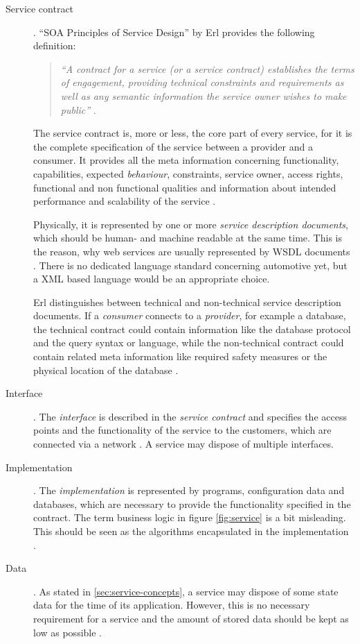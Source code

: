 \begin{description}
\item [Service contract]. 
``SOA Principles of Service Design'' by Erl provides the following definition:
\begin{quote}
\emph{``A contract for a service (or a service contract) establishes the terms of engagement, providing technical constraints and requirements as well as any semantic information the service owner wishes to make public''} 
\cite[ch.6.1]{erl2008}.
\end{quote}
The service contract is, more or less, the core part of every service, for it is the complete specification of the service between a provider and a consumer. It provides all the meta information concerning functionality, capabilities, expected \emph{behaviour}, constraints, service owner, access rights, functional and non functional qualities and information about intended performance and scalability of the service \cite[p.44]{krafzig} \cite[p.26]{josuttis} \cite{breivold}.

Physically, it is represented by one or more \emph{service description documents}, which should be human- and machine readable at the same time. This is the reason, why web services are usually represented by WSDL documents \cite[p.43]{erl2011}. There is no dedicated language standard concerning automotive yet, but a XML based language would be an appropriate choice.

Erl \cite{erl2008} distinguishes between technical and non-technical service description documents. If a \emph{consumer} connects to a \emph{provider}, for example a database, the technical contract could contain information like the database protocol and the query syntax or language, while the non-technical contract could contain related meta information like required safety measures or the physical location of the database \cite[ch.6.1]{erl2008}.

\item [Interface]. 
The \emph{interface} is described in the \emph{service contract} and specifies the access points and the functionality of the service to the customers, which are connected via a network \cite[p.44]{krafzig} \cite{breivold}. A service may dispose of multiple interfaces.

\item [Implementation]. 
The \emph{implementation} is represented by programs, configuration data and databases, which are necessary to provide the functionality specified in the contract. The term business logic in figure \ref{fig:service} is a bit misleading. This should be seen as the algorithms encapsulated in the implementation \cite[p.44]{krafzig}.

\item [Data].
As stated in \ref{sec:service-concepts}, a service may dispose of some state data for the time of its application. However, this is no necessary requirement for a service and the amount of stored data should be kept as low as possible \cite[p.44]{krafzig}.
\end{description}

